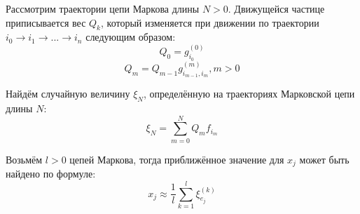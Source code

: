 \documentclass[12pt]{article}
\begin{document}
	\par Рассмотрим траектории цепи Маркова длины $ N > 0 $. Движущейся частице приписывается вес $ Q_k $, который изменяется при движении по траектории $ i_0\to i_1\to ...\to i_n$ следующим образом:
	$$ Q_0 = g_{i_0}^{(0)} $$
	$$ Q_m = Q_{m-1} g_{i_{m-1}, i_m}^{(m)}, m > 0 $$
	\par Найдём случайную величину $ \xi_N $, определённую на траекториях Марковской цепи длины $ N $:
	$$ \xi_N = \sum\limits_{m=0}^N Q_m f_{i_m} $$
	\par Возьмём $ l > 0 $ цепей Маркова, тогда приближённое значение для $ x_j $ может быть найдено по формуле:
	$$ x_j \approx \frac{1}{l} \sum\limits_{k=1}^l \xi_{e_j}^{(k)} $$
	
\end{document}
